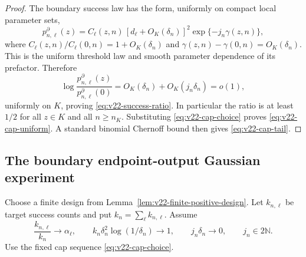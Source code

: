 \begin{proof}
The boundary success law has the form, uniformly on compact local parameter
sets,
\[
 p^\partial_{n,\ell}(z)
 =C_\ell(z,n)\,[d_\ell+O_K(\delta_n)]^2
   \exp\{-j_n\gamma(z,n)\},
\]
where $C_\ell(z,n)/C_\ell(0,n)=1+O_K(\delta_n)$ and
$\gamma(z,n)-\gamma(0,n)=O_K(\delta_n)$.  This is the uniform threshold law
and smooth parameter dependence of its prefactor.  Therefore
\[
 \log\frac{p^\partial_{n,\ell}(z)}
              {p^\partial_{n,\ell}(0)}
 =O_K(\delta_n)+O_K(j_n\delta_n)=o(1),
\]
uniformly on $K$, proving \eqref{eq:v22-success-ratio}.  In particular the
ratio is at least $1/2$ for all $z\in K$ and all $n\ge n_K$.  Substituting
\eqref{eq:v22-cap-choice} proves \eqref{eq:v22-cap-uniform}.  A standard
binomial Chernoff bound then gives \eqref{eq:v22-cap-tail}.
\end{proof}

\subsection{The boundary endpoint-output Gaussian experiment}

Choose a finite design from Lemma~\ref{lem:v22-finite-positive-design}.  Let
$k_{n,\ell}$ be target success counts and put
$k_n=\sum_\ell k_{n,\ell}$.  Assume
\begin{equation}\label{eq:v22-batch-rate}
 \frac{k_{n,\ell}}{k_n}\to\alpha_\ell,
 \qquad
 k_n\delta_n^2\log(1/\delta_n)\to1,
 \qquad
 j_n\delta_n\to0,
 \qquad j_n\in2\mathbb N.
\end{equation}
Use the fixed cap sequence \eqref{eq:v22-cap-choice}.

